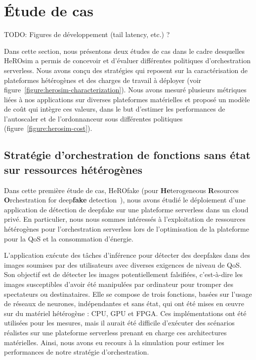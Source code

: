 \section{Étude de cas}
\label{section:herosim-case-study}

TODO: Figures de développement (tail latency, etc.) ?

Dans cette section, nous présentons deux études de cas dans le cadre desquelles HeROsim a permis de concevoir et d'évaluer différentes politiques d'orchestration serverless. Nous avons conçu des stratégies qui reposent sur la caractérisation de plateformes hétérogènes et des charges de travail à déployer (voir figure~\ref{figure:herosim-characterization}). Nous avons mesuré plusieurs métriques liées à nos applications sur diverses plateformes matérielles et proposé un modèle de coût qui intègre ces valeurs, dans le but d'estimer les performances de l'autoscaler et de l'ordonnanceur sous différentes politiques (figure~\ref{figure:herosim-cost}).

\subsection{Stratégie d'orchestration de fonctions sans état sur ressources hétérogènes}

Dans cette première étude de cas, HeROfake (pour \textbf{He}terogeneous \textbf{R}esources \textbf{O}rchestration for deep\textbf{fake} detection~\cite{herofake}), nous avons étudié le déploiement d'une application de détection de deepfake sur une plateforme serverless dans un cloud privé. En particulier, nous nous sommes intéressés à l'exploitation de ressources hétérogènes pour l'orchestration serverless lors de l'optimisation de la plateforme pour la QoS et la consommation d'énergie.

L'application exécute des tâches d'inférence pour détecter des deepfakes dans des images soumises par des utilisateurs avec diverses exigences de niveau de QoS. Son objectif est de détecter les images potentiellement falsifiées, c'est-à-dire les images susceptibles d'avoir été manipulées par ordinateur pour tromper des spectateurs ou destinataires. Elle se compose de trois fonctions, basées sur l'usage de réseaux de neurones, indépendantes et sans état, qui ont été mises en œuvre sur du matériel hétérogène : CPU, GPU et FPGA. Ces implémentations ont été utilisées pour les mesures, mais il aurait été difficile d'exécuter des scénarios réalistes sur une plateforme serverless prenant en charge ces architectures matérielles. Ainsi, nous avons eu recours à la simulation pour estimer les performances de notre stratégie d'orchestration.

